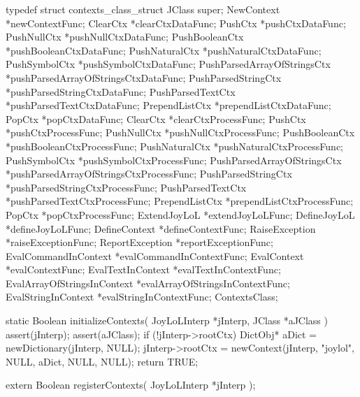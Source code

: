 \startTestSuite[registerContexts]

\startCHeader
typedef struct contexts_class_struct {
  JClass      super;
  NewContext     *newContextFunc;
  ClearCtx       *clearCtxDataFunc;
  PushCtx        *pushCtxDataFunc; 
  PushNullCtx    *pushNullCtxDataFunc;
  PushBooleanCtx *pushBooleanCtxDataFunc;
  PushNaturalCtx *pushNaturalCtxDataFunc;
  PushSymbolCtx  *pushSymbolCtxDataFunc;
  PushParsedArrayOfStringsCtx 
    *pushParsedArrayOfStringsCtxDataFunc;
  PushParsedStringCtx
    *pushParsedStringCtxDataFunc;
  PushParsedTextCtx
    *pushParsedTextCtxDataFunc;
  PrependListCtx *prependListCtxDataFunc;
  PopCtx         *popCtxDataFunc;
  ClearCtx       *clearCtxProcessFunc;
  PushCtx        *pushCtxProcessFunc;
  PushNullCtx    *pushNullCtxProcessFunc;
  PushBooleanCtx *pushBooleanCtxProcessFunc;
  PushNaturalCtx *pushNaturalCtxProcessFunc;
  PushSymbolCtx  *pushSymbolCtxProcessFunc;
  PushParsedArrayOfStringsCtx
    *pushParsedArrayOfStringsCtxProcessFunc;
  PushParsedStringCtx
    *pushParsedStringCtxProcessFunc;
  PushParsedTextCtx
    *pushParsedTextCtxProcessFunc;
  PrependListCtx *prependListCtxProcessFunc;
  PopCtx         *popCtxProcessFunc;
  ExtendJoyLoL   *extendJoyLoLFunc;
  DefineJoyLoL   *defineJoyLoLFunc;
  DefineContext  *defineContextFunc;
  RaiseException *raiseExceptionFunc;
  ReportException
    *reportExceptionFunc;
  EvalCommandInContext
    *evalCommandInContextFunc;
  EvalContext    *evalContextFunc;
  EvalTextInContext
    *evalTextInContextFunc;
  EvalArrayOfStringsInContext
    *evalArrayOfStringsInContextFunc;
  EvalStringInContext
    *evalStringInContextFunc;
} ContextsClass;
\stopCHeader

\startCCode
static Boolean initializeContexts(
  JoyLoLInterp *jInterp,
  JClass   *aJClass
) {
  assert(jInterp);
  assert(aJClass);
  if (!jInterp->rootCtx) {
    DictObj* aDict = newDictionary(jInterp, NULL);
    jInterp->rootCtx =
      newContext(jInterp, "joylol", NULL, aDict, NULL, NULL);
  }
  return TRUE;
}
\stopCCode

\startCHeader
extern Boolean registerContexts(
  JoyLoLInterp *jInterp
);
\stopCHeader
{}

